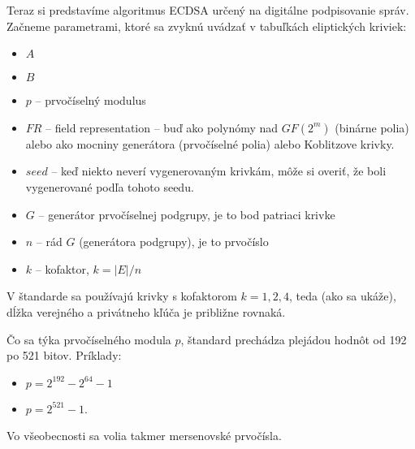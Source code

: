 Teraz si predstavíme algoritmus ECDSA určený na digitálne podpisovanie
správ.
Začneme parametrami, ktoré sa zvyknú uvádzať v tabuľkách eliptických
kriviek:
\begin{itemize}
    \item $A$
    \item $B$
    \item $p$ -- prvočíselný modulus
    \item $FR$ -- field representation -- buď ako polynómy nad
        $GF(2^m)$ (binárne polia)
        alebo ako mocniny generátora (prvočíselné polia)
        alebo Koblitzove krivky.
    \item $seed$ -- keď niekto neverí vygenerovaným krivkám, môže si
        overiť, že boli vygenerované podľa tohoto seedu.
    \item $G$ -- generátor prvočíselnej podgrupy, je to bod patriaci krivke
    \item $n$ -- rád $G$ (generátora podgrupy), je to prvočíslo
    \item $k$ -- kofaktor, $k=|E| / n$
\end{itemize}
\begin{poznamka}
    V štandarde sa používajú krivky s kofaktorom $k=1,2,4$, teda (ako
    sa ukáže), dĺžka verejného a privátneho kľúča je približne
    rovnaká.
\end{poznamka}

Čo sa týka prvočíselného modula $p$, štandard prechádza plejádou
hodnôt od 192 po 521 bitov.
Príklady:
\begin{itemize}
    \item $p=2^{192} - 2^{64} - 1$ 
    \item $p=2^{521} - 1$.
\end{itemize}
Vo všeobecnosti sa volia takmer mersenovské prvočísla.

